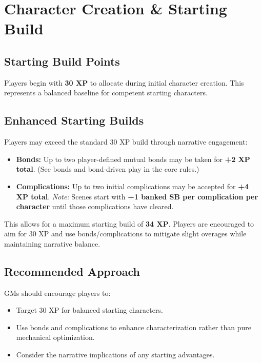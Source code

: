 

\section{Character Creation \& Starting Build}

\subsection{Starting Build Points}
Players begin with \textbf{30 XP} to allocate during initial character creation. This represents a balanced baseline for competent starting characters.

\subsection{Enhanced Starting Builds}
Players may exceed the standard 30 XP build through narrative engagement:
\begin{itemize}
  \item \textbf{Bonds:} Up to two player-defined mutual bonds may be taken for \textbf{+2 XP total}. (See bonds and bond-driven play in the core rules.)
  \item \textbf{Complications:} Up to two initial complications may be accepted for \textbf{+4 XP total}. \emph{Note:} Scenes start with \textbf{+1 banked SB per complication per character} until those complications have cleared.
\end{itemize}
This allows for a maximum starting build of \textbf{34 XP}. Players are encouraged to aim for 30 XP and use bonds/complications to mitigate slight overages while maintaining narrative balance.

\subsection{Recommended Approach}
GMs should encourage players to:
\begin{itemize}
  \item Target 30 XP for balanced starting characters.
  \item Use bonds and complications to enhance characterization rather than pure mechanical optimization.
  \item Consider the narrative implications of any starting advantages.
\end{itemize}

